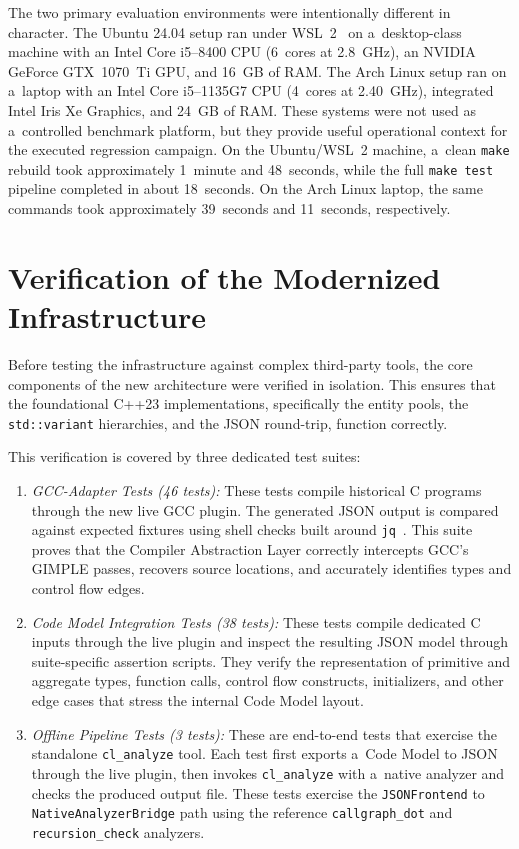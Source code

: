\documentclass[xpsejal00-gcc-plugin.tex]{subfiles}
\begin{document}
The two primary evaluation environments were intentionally different in character.
The Ubuntu 24.04 setup ran under WSL~2~\cite{WSL2} on a~desktop-class machine with an Intel Core i5--8400 CPU (6~cores at 2.8~GHz), an NVIDIA GeForce GTX~1070~Ti GPU, and 16~GB of RAM.\@
The Arch Linux setup ran on a~laptop with an Intel Core i5--1135G7 CPU (4~cores at 2.40~GHz), integrated Intel Iris Xe Graphics, and 24~GB of RAM.\@
These systems were not used as a~controlled benchmark platform, but they provide useful operational context for the executed regression campaign.
On the Ubuntu/WSL~2 machine, a~clean \texttt{make} rebuild took approximately 1~minute and 48~seconds, while the full \texttt{make test} pipeline completed in about 18~seconds.
On the Arch Linux laptop, the same commands took approximately 39~seconds and 11~seconds, respectively.

\section{Verification of the Modernized Infrastructure}\label{sec:verification}

Before testing the infrastructure against complex third-party tools, the core components of the new architecture were verified in isolation.
This ensures that the foundational C++23 implementations, specifically the entity pools, the \texttt{std::variant} hierarchies, and the JSON round-trip, function correctly.

This verification is covered by three dedicated test suites:

\begin{enumerate}
  \item \textit{GCC-Adapter Tests (46 tests):} These tests compile historical C programs through the new live GCC plugin.
    The generated JSON output is compared against expected fixtures using shell checks built around \texttt{jq}~\cite{JQ}.
    This suite proves that the Compiler Abstraction Layer correctly intercepts GCC's GIMPLE passes, recovers source locations, and accurately identifies types and control flow edges.
  \item \textit{Code Model Integration Tests (38 tests):} These tests compile dedicated C inputs through the live plugin and inspect the resulting JSON model through suite-specific assertion scripts.
    They verify the representation of primitive and aggregate types, function calls, control flow constructs, initializers, and other edge cases that stress the internal Code Model layout.
  \item \textit{Offline Pipeline Tests (3 tests):} These are end-to-end tests that exercise the standalone \texttt{cl\_analyze} tool.
    Each test first exports a~Code Model to JSON through the live plugin, then invokes \texttt{cl\_analyze} with a~native analyzer and checks the produced output file.
    These tests exercise the \texttt{JSONFrontend} to \texttt{NativeAnalyzerBridge} path using the reference \texttt{callgraph\_dot} and \texttt{recursion\_check} analyzers.
\end{enumerate}
\end{document}
